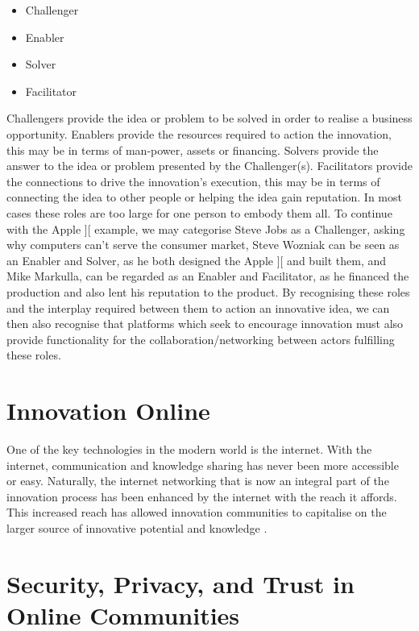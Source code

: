 \begin{itemize}
	\item Challenger
	\item Enabler
	\item Solver
	\item Facilitator
\end{itemize}

Challengers provide the idea or problem to be solved in order to realise a business opportunity. Enablers provide the resources required to action the innovation, this may be in terms of man-power, assets or financing. Solvers provide the answer to the idea or problem presented by the Challenger(s). Facilitators provide the connections to drive the innovation's execution, this may be in terms of connecting the idea to other people or helping the idea gain reputation. In most cases these roles are too large for one person to embody them all. To continue with the Apple ][ example, we may categorise Steve Jobs as a Challenger, asking why computers can't serve the consumer market, Steve Wozniak can be seen as an Enabler and Solver, as he both designed the Apple ][ and built them, and Mike Markulla, can be regarded as an Enabler and Facilitator, as he financed the production and also lent his reputation to the product. By recognising these roles and the interplay required between them to action an innovative idea, we can then also recognise that platforms which seek to encourage innovation must also provide functionality for the collaboration/networking between actors fulfilling these roles.

\section{Innovation Online}
One of the key technologies in the modern world is the internet. With the internet, communication and knowledge sharing has never been more accessible or easy. Naturally, the internet networking that is now an integral part of the innovation process has been enhanced by the internet with the reach it affords. This increased reach has allowed innovation communities to capitalise on the larger source of innovative potential and knowledge \cite{hautz2010establish}.

\section{Security, Privacy, and Trust in Online Communities}


